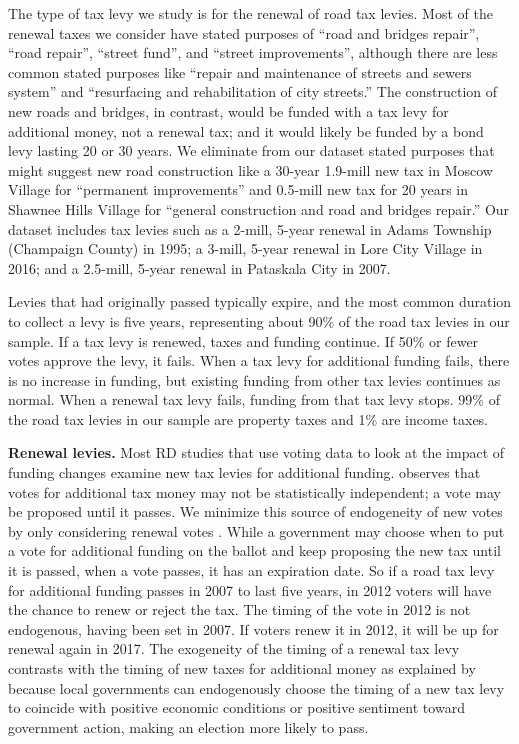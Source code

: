The type of tax levy we study is for the renewal of road tax levies. Most of the renewal taxes we consider have stated purposes of “road and bridges repair”, “road repair”, “street fund”, and “street improvements”, although there are less common stated purposes like “repair and maintenance of streets and sewers system” and “resurfacing and rehabilitation of city streets.”  The construction of new roads and bridges, in contrast, would be funded with a tax levy for additional money, not a renewal tax; and it would likely be funded by a bond levy lasting 20 or 30 years.  We eliminate from our dataset stated purposes that might suggest new road construction like a 30-year 1.9-mill new tax in Moscow Village for “permanent improvements” and 0.5-mill new tax for 20 years in Shawnee Hills Village for “general construction and road and bridges repair.” Our dataset includes tax levies such as a 2-mill, 5-year renewal in Adams Township (Champaign County) in 1995; a 3-mill, 5-year renewal in Lore City Village in 2016; and a 2.5-mill, 5-year renewal in Pataskala City in 2007.

 Levies that had originally passed typically expire, and the most common duration to collect a levy is five years, representing about 90\% of the road tax levies in our sample.  If a tax levy is renewed, taxes and funding continue.  If 50\% or fewer votes approve the levy, it fails.  When a tax levy for additional funding fails, there is no increase in funding, but existing funding from other tax levies continues as normal.  When a renewal tax levy fails, funding from that tax levy stops.  99\% of the road tax levies in our sample are property taxes and 1\% are income taxes.

{\bf Renewal levies.} Most RD studies that use voting data to look at the impact of funding changes examine new tax levies for additional funding.  \cite{cellini2010value} observes that votes for additional tax money may not be statistically independent; a vote may be proposed until it passes.  We minimize this source of endogeneity of new votes by only considering renewal votes \citep{brasington2017school}.  While a government may choose when to put a vote for additional funding on the ballot and keep proposing the new tax until it is passed, when a vote passes, it has an expiration date.  So if a road tax levy for additional funding passes in 2007 to last five years, in 2012 voters will have the chance to renew or reject the tax.  The timing of the vote in 2012 is not endogenous, having been set in 2007.  If voters renew it in 2012, it will be up for renewal again in 2017. The exogeneity of the timing of a renewal tax levy contrasts with the timing of new taxes for additional money as explained by \cite{cellini2010value} because local governments can endogenously choose the timing of a new tax levy to coincide with positive economic conditions or positive sentiment toward government action, making an election more likely to pass.


